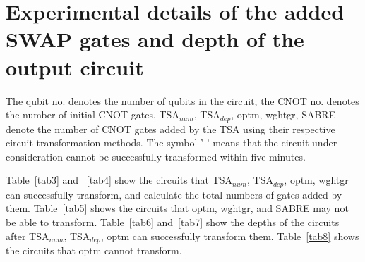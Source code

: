 \documentclass[journal]{IEEEtran}
\begin{document}


\newpage
\appendix
\section*{Experimental details of the added SWAP gates and depth of the output circuit}
The qubit no. denotes the number of qubits in the circuit, the CNOT no. denotes the number of initial CNOT gates, TSA$_{num}$, TSA$_{dep}$, optm, wghtgr, SABRE denote the number of CNOT gates added by the TSA using their respective circuit transformation methods. %
The symbol '-' means that the circuit under consideration cannot be successfully transformed within five minutes.

Table~\ref{tab3} and ~\ref{tab4} show the circuits that TSA$_{num}$, TSA$_{dep}$, optm, wghtgr can successfully transform, and calculate the total numbers of gates added by them. Table~\ref{tab5} shows the circuits that optm, wghtgr, and SABRE may not be able to transform. Table~\ref{tab6} and~\ref{tab7} show the depths of the circuits after TSA$_{num}$, TSA$_{dep}$, optm can successfully transform them.  Table~\ref{tab8} shows the circuits that optm cannot transform.
\end{document}
